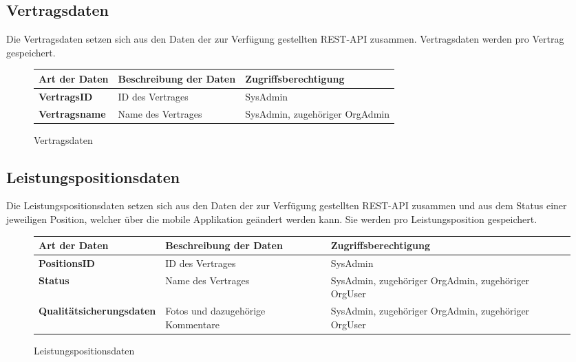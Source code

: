 \subsection{Vertragsdaten}

Die Vertragsdaten setzen sich aus den Daten der zur Verf\"ugung gestellten REST-API zusammen. Vertragsdaten werden pro Vertrag gespeichert.

\begin{figure}[h]
	\centering
	\begin{tabularx}{\textwidth}{| X || X | X |}
        \hline
		\textbf{Art der Daten} & \textbf{Beschreibung der Daten} & \textbf{Zugriffsberechtigung} \\ \hline \hline
		\textbf{VertragsID} & ID des Vertrages & SysAdmin \\ \hline
		\textbf{Vertragsname} & Name des Vertrages & SysAdmin, zugehöriger OrgAdmin \\ \hline
	\end{tabularx}
	\caption{Vertragsdaten}
	\label{fig:Vertragsdaten}
\end{figure}

\subsection{Leistungspositionsdaten}

Die Leistungspositionsdaten setzen sich aus den Daten der zur Verf\"ugung gestellten REST-API zusammen und aus dem Status einer jeweiligen Position, welcher über die mobile Applikation geändert werden kann.
Sie werden pro Leistungsposition gespeichert.

\begin{figure}[h]
	\centering
	\begin{tabularx}{\textwidth}{| X || X | X |}
        \hline
		\textbf{Art der Daten} & \textbf{Beschreibung der Daten} & \textbf{Zugriffsberechtigung} \\ \hline \hline
		\textbf{PositionsID} & ID des Vertrages & SysAdmin \\ \hline
		\textbf{Status} & Name des Vertrages & SysAdmin, zugehöriger OrgAdmin, zugehöriger OrgUser \\ \hline
		\textbf{Qualitätsicherungsdaten} & Fotos und dazugehörige Kommentare & SysAdmin, zugehöriger OrgAdmin, zugehöriger OrgUser \\ \hline
	\end{tabularx}
	\caption{Leistungspositionsdaten}
	\label{fig:Leistungspositionsdaten}
\end{figure}
